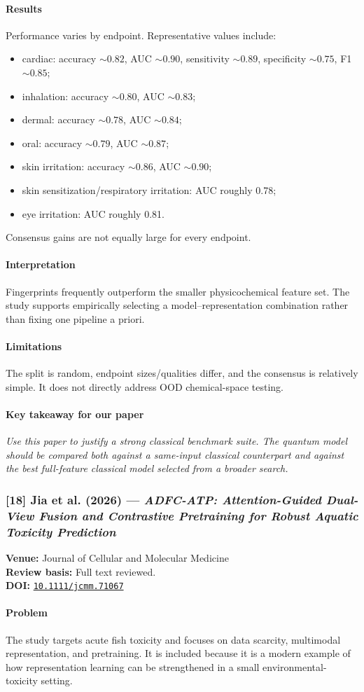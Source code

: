 \documentclass[11pt]{article}
\newcommand{\reviewfield}[2]{\paragraph{#1}#2}
\newcommand{\keytakeaway}[1]{\paragraph{Key takeaway for our paper}\emph{#1}}
\newcommand{\paperdoi}[1]{\href{https://doi.org/#1}{\texttt{#1}}}
\begin{document}
\reviewfield{Results}{
Performance varies by endpoint. Representative values include:
\begin{itemize}
    \item cardiac: accuracy $\sim0.82$, AUC $\sim0.90$, sensitivity $\sim0.89$, specificity $\sim0.75$, F1 $\sim0.85$;
    \item inhalation: accuracy $\sim0.80$, AUC $\sim0.83$;
    \item dermal: accuracy $\sim0.78$, AUC $\sim0.84$;
    \item oral: accuracy $\sim0.79$, AUC $\sim0.87$;
    \item skin irritation: accuracy $\sim0.86$, AUC $\sim0.90$;
    \item skin sensitization/respiratory irritation: AUC roughly 0.78;
    \item eye irritation: AUC roughly 0.81.
\end{itemize}
Consensus gains are not equally large for every endpoint.
}

\reviewfield{Interpretation}{
Fingerprints frequently outperform the smaller physicochemical feature set. The study supports empirically selecting a model--representation combination rather than fixing one pipeline a priori.
}

\reviewfield{Limitations}{
The split is random, endpoint sizes/qualities differ, and the consensus is relatively simple. It does not directly address OOD chemical-space testing.
}

\keytakeaway{Use this paper to justify a strong classical benchmark suite. The quantum model should be compared both against a same-input classical counterpart and against the best full-feature classical model selected from a broader search.}


\subsubsection{[18] Jia et al. (2026) --- \textit{ADFC-ATP: Attention-Guided Dual-View Fusion and Contrastive Pretraining for Robust Aquatic Toxicity Prediction}}
\textbf{Venue:} Journal of Cellular and Molecular Medicine\\
\textbf{Review basis:} Full text reviewed.\\
\textbf{DOI:} \paperdoi{10.1111/jcmm.71067}

\reviewfield{Problem}{
The study targets acute fish toxicity and focuses on data scarcity, multimodal representation, and pretraining. It is included because it is a modern example of how representation learning can be strengthened in a small environmental-toxicity setting.
}
\end{document}
